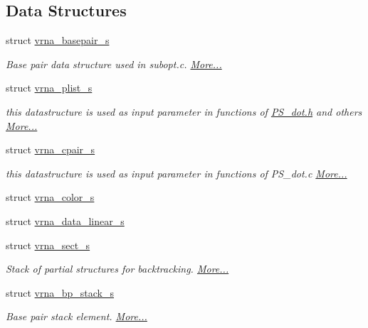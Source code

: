 \subsection*{Data Structures}
\begin{DoxyCompactItemize}
\item 
struct \hyperlink{group__data__structures_structvrna__basepair__s}{vrna\+\_\+basepair\+\_\+s}
\begin{DoxyCompactList}\small\item\em Base pair data structure used in subopt.\+c.  \hyperlink{group__data__structures_structvrna__basepair__s}{More...}\end{DoxyCompactList}\item 
struct \hyperlink{group__data__structures_structvrna__plist__s}{vrna\+\_\+plist\+\_\+s}
\begin{DoxyCompactList}\small\item\em this datastructure is used as input parameter in functions of \hyperlink{PS__dot_8h}{P\+S\+\_\+dot.\+h} and others  \hyperlink{group__data__structures_structvrna__plist__s}{More...}\end{DoxyCompactList}\item 
struct \hyperlink{group__data__structures_structvrna__cpair__s}{vrna\+\_\+cpair\+\_\+s}
\begin{DoxyCompactList}\small\item\em this datastructure is used as input parameter in functions of P\+S\+\_\+dot.\+c  \hyperlink{group__data__structures_structvrna__cpair__s}{More...}\end{DoxyCompactList}\item 
struct \hyperlink{group__data__structures_structvrna__color__s}{vrna\+\_\+color\+\_\+s}
\item 
struct \hyperlink{group__data__structures_structvrna__data__linear__s}{vrna\+\_\+data\+\_\+linear\+\_\+s}
\item 
struct \hyperlink{group__data__structures_structvrna__sect__s}{vrna\+\_\+sect\+\_\+s}
\begin{DoxyCompactList}\small\item\em Stack of partial structures for backtracking.  \hyperlink{group__data__structures_structvrna__sect__s}{More...}\end{DoxyCompactList}\item 
struct \hyperlink{group__data__structures_structvrna__bp__stack__s}{vrna\+\_\+bp\+\_\+stack\+\_\+s}
\begin{DoxyCompactList}\small\item\em Base pair stack element.  \hyperlink{group__data__structures_structvrna__bp__stack__s}{More...}\end{DoxyCompactList}\item 

\end{DoxyCompactItemize}
